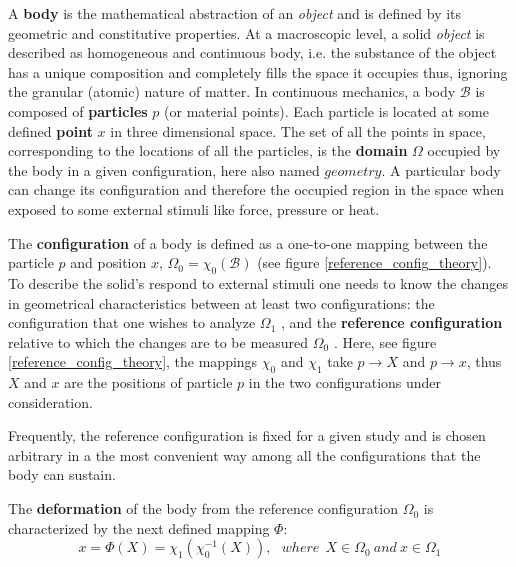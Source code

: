 	A \textbf{body} is the mathematical abstraction of an \textit{object} and is defined by its geometric and constitutive properties.  At a macroscopic level, a solid \textit{object} is described as homogeneous and continuous body, i.e. the substance of the object has a unique composition and completely fills the space it occupies thus, ignoring the granular (atomic) nature of matter. In continuous mechanics, a body $\mathcal{B}$ is composed of \textbf{particles} $p$  (or material points). Each particle is located at some defined \textbf{point}  $x$ in three dimensional space. The set of all the points in space, corresponding to the locations of all the particles, is the \textbf{domain} $\Omega$  occupied by the body in a given configuration, here also named $geometry$. A particular body can change its configuration and therefore the occupied region in the space when exposed to some external stimuli like force, pressure or heat.
	
 The \textbf{configuration} of a body is defined as a one-to-one mapping between the particle $p$ and position $x$, $\Omega_0 = \chi_0 (\mathcal{B})$ (see figure \ref{reference_config_theory}). To describe the solid's respond to external stimuli one needs to know the changes in geometrical characteristics between at least two configurations: the configuration that one wishes to analyze $\Omega_1$ , and the \textbf{reference configuration} relative to which the changes are to be measured $\Omega_0$  . Here, see figure \ref{reference_config_theory}, the mappings $\chi_0$ and $\chi_1$ take $p \rightarrow X$ and $p \rightarrow x$, thus $X$ and $x$ are the positions of particle $p$ in the two configurations under consideration.

Frequently, the reference configuration is fixed for a given study and is chosen arbitrary in a the most convenient way among all the configurations that the body can sustain. 
 
 The \textbf{deformation} of the body from the reference configuration $\Omega_0$ is characterized by the next defined mapping $\Phi$:
 \begin{equation} 
 x = \Phi(X) = \chi_1(\chi_0^{-1}(X)), \ \ \  where \ \  X \in \Omega_0 \ and \ x \in \Omega_1
 \label{referenceToCurrentCoordinates}
 \end{equation}
 
